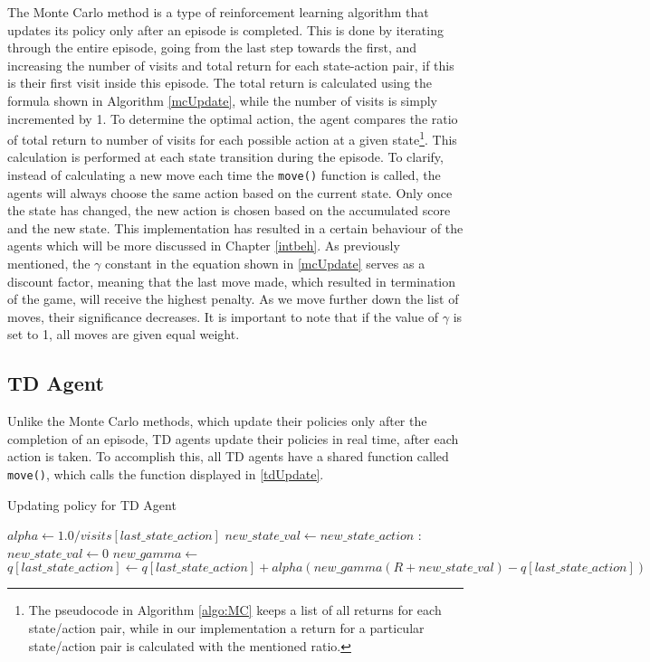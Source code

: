 The Monte Carlo method is a type of reinforcement learning algorithm that updates its policy only after an episode is completed. This is done by iterating through the entire episode, going from the last step towards the first, and increasing the number of visits and total return for each state-action pair, if this is their first visit inside this episode. The total return is calculated using the formula shown in Algorithm \ref{mcUpdate}, while the number of visits is simply incremented by 1. To determine the optimal action, the agent compares the ratio of total return to number of visits for each possible action at a given state\footnote{The pseudocode in Algorithm \ref{algo:MC} keeps a list of all returns for each state/action pair, while in our implementation a return for a particular state/action pair is calculated with the mentioned ratio.}. This calculation is performed at each state transition during the episode. To clarify, instead of calculating a new move each time the \texttt{move()} function is called, the agents will always choose the same action based on the current state. Only once the state has changed, the new action is chosen based on the accumulated score and the new state. This implementation has resulted in a certain behaviour of the agents which will be more discussed in Chapter \ref{intbeh}.
As previously mentioned, the $\gamma$ constant in the equation shown in \ref{mcUpdate} serves as a discount factor, meaning that the last move made, which resulted in termination of the game, will receive the highest penalty. As we move further down the list of moves, their significance decreases. It is important to note that if the value of $\gamma$ is set to 1, all moves are given equal weight. 

\subsection{TD Agent}	
Unlike the Monte Carlo methods, which update their policies only after the completion of an episode, TD agents update their policies in real time, after each action is taken. To accomplish this, all TD agents have a shared function called \texttt{move()}, which calls the function displayed in \ref{tdUpdate}. 

\begin{algorithm}
\caption{Updating policy for TD Agent}\label{tdUpdate}
\begin{algorithmic}[1]
\State $ alpha \gets 1.0 / visits[last\_state\_action]$
\State $new\_state\_val \gets new\_state\_action$
:
\State $new\_state\_val \gets0$
\EndIf
\State $new\_gamma \gets $
\State $q[last\_state\_action] \gets q[last\_state\_action] + alpha(new\_gamma(R + new\_state\_val) - q[last\_state\_action])$
\end{algorithmic}
\end{algorithm}

